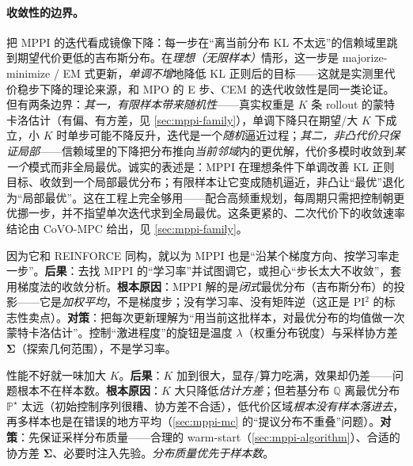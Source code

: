 \paragraph{收敛性的边界。}把 MPPI 的迭代看成镜像下降：每一步在“离当前分布 KL 不太远”的信赖域里跳到期望代价更低的吉布斯分布。在\emph{理想（无限样本）}情形，这一步是 majorize-minimize / EM 式更新，\emph{单调不增}地降低 KL 正则后的目标——这就是实测里代价稳步下降的理论来源，和 MPO 的 E 步、CEM 的迭代收敛性是同一类论证。但有两条边界：\emph{其一，有限样本带来随机性}——真实权重是 $K$ 条 rollout 的蒙特卡洛估计（有偏、有方差，见 \cref{sec:mppi-family}），单调下降只在期望/大 $K$ 下成立，小 $K$ 时单步可能不降反升，迭代是一个\emph{随机}逼近过程；\emph{其二，非凸代价只保证局部}——信赖域里的下降把分布推向\emph{当前邻域}内的更优解，代价多模时收敛到\emph{某一个}模式而非全局最优。诚实的表述是：MPPI 在理想条件下单调改善 KL 正则目标、收敛到一个局部最优分布；有限样本让它变成随机逼近，非凸让“最优”退化为“局部最优”。这在工程上完全够用——配合高频重规划，每周期只需把控制朝更优挪一步，并不指望单次迭代求到全局最优。这条更紧的、二次代价下的收敛速率结论由 CoVO-MPC 给出，见 \cref{sec:mppi-family}。

\begin{pitfall}
因为它和 REINFORCE 同构，就以为 MPPI 也是“沿某个梯度方向、按学习率走一步”。\textbf{后果}：去找 MPPI 的“学习率”并试图调它，或担心“步长太大不收敛”，套用梯度法的收敛分析。\textbf{根本原因}：MPPI 解的是\emph{闭式}最优分布（吉布斯分布）的投影——它是\emph{加权平均}，不是梯度步；没有学习率、没有矩阵逆（这正是 PI$^2$ 的标志性卖点）。\textbf{对策}：把每次更新理解为“用当前这批样本，对最优分布的均值做一次蒙特卡洛估计”。控制“激进程度”的旋钮是温度 $\lambda$（权重分布锐度）与采样协方差 $\boldsymbol{\Sigma}$（探索几何范围），不是学习率。
\end{pitfall}

\begin{pitfall}
性能不好就一味加大 $K$。\textbf{后果}：$K$ 加到很大，显存/算力吃满，效果却仍差——问题根本不在样本数。\textbf{根本原因}：$K$ 大只降低\emph{估计方差}；但若基分布 $\mathbb{Q}$ 离最优分布 $\mathbb{P}^\star$ 太远（初始控制序列很糟、协方差不合适），低代价区域\emph{根本没有样本落进去}，再多样本也是在错误的地方平均（\cref{sec:mppi-mc} 的“提议分布不重叠”问题）。\textbf{对策}：先保证采样分布质量——合理的 warm-start（\cref{sec:mppi-algorithm}）、合适的协方差 $\boldsymbol{\Sigma}$、必要时注入先验。\emph{分布质量优先于样本数}。
\end{pitfall}

